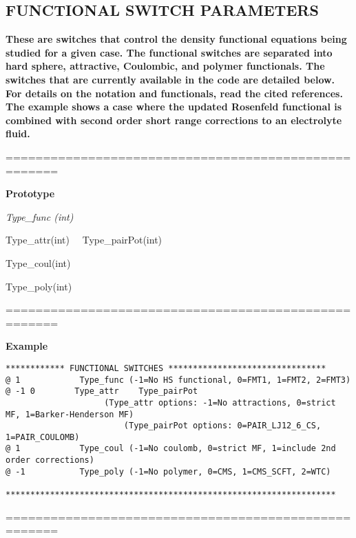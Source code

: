 \documentclass[10pt,onecolumn]{article}
\begin{document}
\subsection{FUNCTIONAL SWITCH PARAMETERS}
{\bf
These are switches that control the density functional equations being studied
for a given case.  The functional switches are separated into hard sphere,
attractive, Coulombic, and polymer functionals.
The switches that are currently available
in the code are detailed below.  For details on the notation and functionals, read the cited references.  The example shows a case where the
updated Rosenfeld functional is combined with second order short range
corrections to an electrolyte fluid.}

\vspace{0.1in}
\noindent=====================================================

{\bf Prototype}

{\it Type\_func (int)

Type\_attr(int) \ \    Type\_pairPot(int)

Type\_coul(int)

Type\_poly(int)

}

\noindent=====================================================

{\bf Example}

\begin{verbatim}
************ FUNCTIONAL SWITCHES ********************************
@ 1            Type_func (-1=No HS functional, 0=FMT1, 1=FMT2, 2=FMT3)
@ -1 0        Type_attr    Type_pairPot
           		 	(Type_attr options: -1=No attractions, 0=strict MF, 1=Barker-Henderson MF) 
            			(Type_pairPot options: 0=PAIR_LJ12_6_CS, 1=PAIR_COULOMB)
@ 1            Type_coul (-1=No coulomb, 0=strict MF, 1=include 2nd order corrections)
@ -1           Type_poly (-1=No polymer, 0=CMS, 1=CMS_SCFT, 2=WTC)

*******************************************************************
\end{verbatim}

\noindent=====================================================
\vspace{0.1in}


\noindent\dotfill
\end{document}
